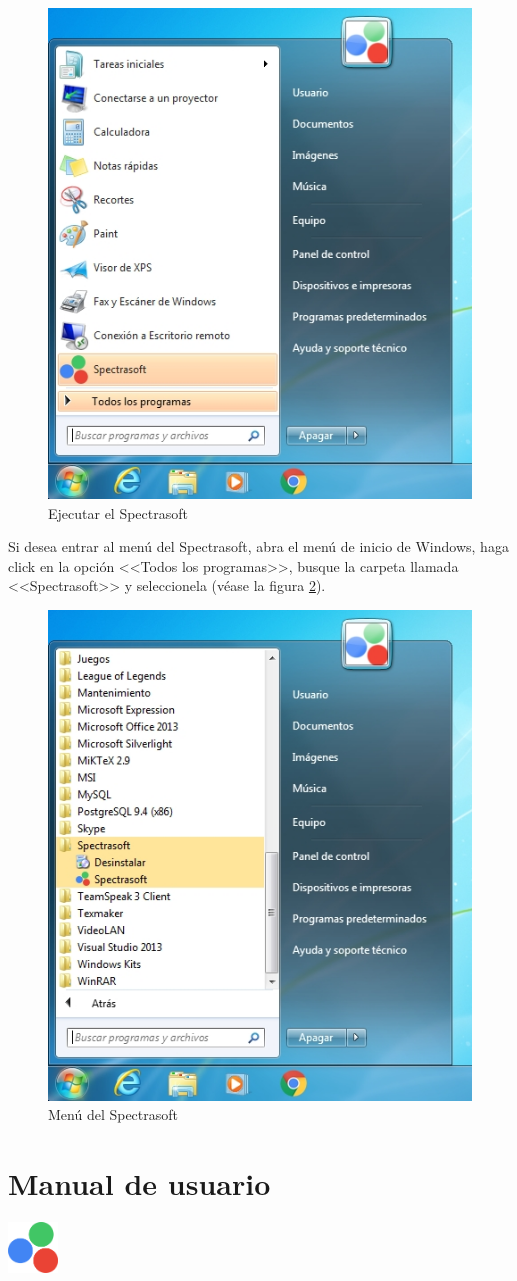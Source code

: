 \begin{figure}[H]
  \centering
  \includegraphics[width=.4\linewidth]{./img/spectrasoft-ejecutable.jpg}
\caption[]{Ejecutar el Spectrasoft\label{fig:spectrasoft-ejecutable}}
\end{figure}

Si desea entrar al men\'{u} del Spectrasoft, abra el men\'{u} de inicio de Windows, haga click en la opci\'{o}n <<Todos los programas>>, busque la carpeta llamada <<Spectrasoft>> y seleccionela (v\'{e}ase la figura \ref{fig:spectrasoft-menu}).

\begin{figure}[H]
  \centering
  \includegraphics[width=.4\linewidth]{./img/spectrasoft-menu.jpg}
\caption[]{Men\'{u} del Spectrasoft\label{fig:spectrasoft-menu}}
\end{figure}
\newpage
\chapter{Manual de usuario}
\thispagestyle{fancy}

\begin{center}
	\includegraphics[width=0.10\textwidth]{./img/logo.png}
\end{center}

